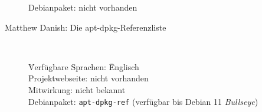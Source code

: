 \documentclass[10pt,a4paper]{article}
\begin{document}
\begin{description}
\begin{tabbing}
            \> Debianpaket: \> \> nicht vorhanden \\
        \end{tabbing}
        
    \item[Matthew Danish: Die apt-dpkg-Referenzliste] ~ \\
        \begin{tabbing}
            \= Verfügbare Sprachen: \= \= Englisch \\
            \> Projektwebseite: \> \> nicht vorhanden \\
            \> Mitwirkung: \> \> nicht bekannt \\
            
            \> Debianpaket: \> \> \texttt{apt-dpkg-ref} (verfügbar bis Debian 11 \textit{Bullseye})
        \end{tabbing}
\end{description}
\end{document}
